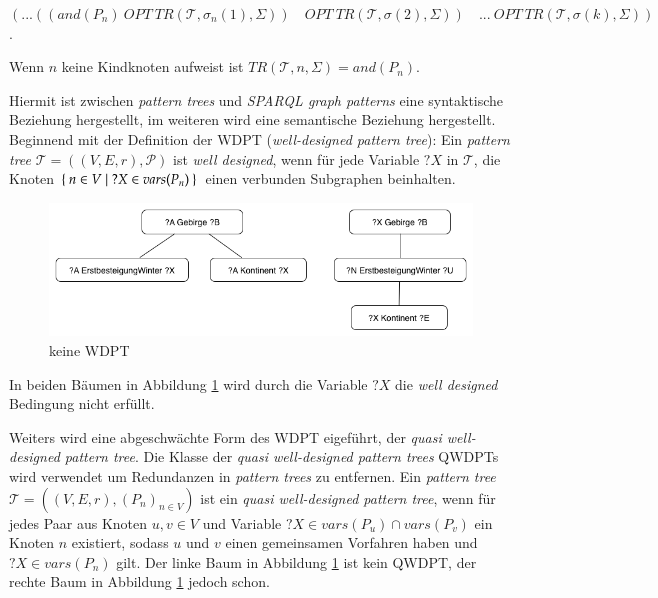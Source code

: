 \documentclass[draft,final]{vutinfth} %
\begin{document}
$(...((and(P_n) \ OPT \ TR(\mathcal{T},\sigma_n(1),\Sigma)) \quad OPT \ TR(\mathcal{T},\sigma(2),\Sigma)) \quad ... \ OPT \ TR(\mathcal{T},\sigma(k),\Sigma))$.

Wenn $n$ keine Kindknoten aufweist ist $TR(\mathcal{T},n,\Sigma) = and(P_n)$. 

Hiermit ist zwischen \textit{pattern trees} und \textit{SPARQL graph patterns} eine syntaktische Beziehung hergestellt, im weiteren wird eine semantische Beziehung hergestellt. Beginnend mit der Definition der WDPT (\textit{well-designed pattern tree}): Ein \textit{pattern tree} $\mathcal{T} = ((V,E,r),\mathcal{P})$ ist \textit{well designed}, wenn für jede Variable $?X$ in $\mathcal{T}$, die Knoten $\Set{n \in V | ?X \in vars(P_n)}$ einen verbunden Subgraphen beinhalten. 

\begin{figure}[ht]
	\centering
	\includegraphics[width=1\textwidth]{wdpt_sem}
	\caption{keine WDPT}
	\label{keineWDPT}
\end{figure}

In beiden Bäumen in Abbildung \ref{keineWDPT} wird durch die Variable $?X$ die \textit{well designed} Bedingung nicht erfüllt.

Weiters wird eine abgeschwächte Form des WDPT eigeführt, der \textit{quasi well-designed pattern tree}. Die Klasse der \textit{quasi well-designed pattern trees} QWDPTs wird verwendet um Redundanzen in \textit{pattern trees} zu entfernen. Ein \textit{pattern tree} $\mathcal{T} = ((V,E,r),(P_n)_{n \in V})$ ist ein \textit{quasi well-designed pattern tree}, wenn für jedes Paar aus Knoten $u,v \in V$ und Variable $?X \in vars(P_u) \cap vars(P_v)$ ein Knoten $n$ existiert, sodass $u$ und $v$ einen gemeinsamen Vorfahren haben und $?X \in vars(P_n)$ gilt. Der linke Baum in Abbildung \ref{keineWDPT} ist kein QWDPT, der rechte Baum in Abbildung \ref{keineWDPT} jedoch schon.
\end{document}
